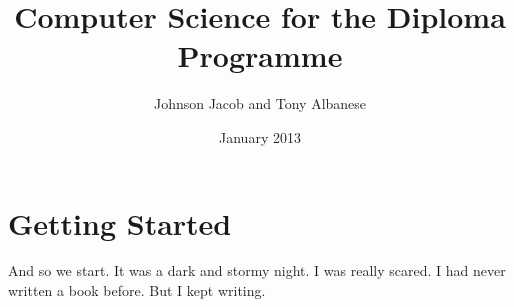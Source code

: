 \documentclass[a4paper,12pt]{book}
\begin{document}
\author{Johnson Jacob and Tony Albanese}
\title{Computer Science for the Diploma Programme}
\date{January 2013}

\frontmatter
\maketitle
\tableofcontents

\mainmatter

\chapter{Getting Started}

And so we start. It was a dark and stormy night. I was really scared. I had never written a book before. But I kept writing.
%
%

\backmatter
\end{document}
